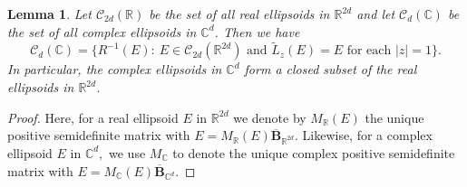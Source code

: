\documentclass[10pt,a4paper]{amsart}
\newtheorem{lemma}{Lemma}
\newcommand{\complex}{\mathbb{C}}
\newcommand{\reals}{\mathbb{R}}
\begin{document}
     \begin{lemma}
         \label{lem:complex_vs_real_ellipsoids}
          Let $\mathcal{C}_{2d}(\reals)$ be the set of all real ellipsoids in $\reals^{2d}$ and let $\mathcal{C}_{d}(\complex)$ be the set of all complex ellipsoids in $\complex^{d}$. Then we have
     \begin{equation}
     	\label{eq:complex_ellipsoids}
     	\mathcal{C}_{d}(\complex) = \{R^{-1}(E):~E\in\mathcal{C}_{2d}(\reals^{2d})\text{ and }\widetilde{L}_{z}(E)=E \text{ for each } |z| = 1\}.
     \end{equation}
     In particular, the complex ellipsoids in $\complex^d$ form a closed subset of the real ellipsoids in $\reals^{2d}$.
     \end{lemma}

    \begin{proof}   
     Here, for a real ellipsoid $E$ in $\reals^{2d}$ we denote by $M_\reals(E)$ the unique positive semidefinite matrix with $E = M_{\reals}(E)\mathbf{\overline{B}}_{\reals^{2d}}.$
     Likewise, for a complex ellipsoid $E$ in $\complex^d,$ we use $M_\complex$ to denote the unique complex positive semidefinite matrix with $E = M_{\complex}(E)\mathbf{\overline{B}}_{\complex^{d}}.$
     

\end{proof}
\end{document}
